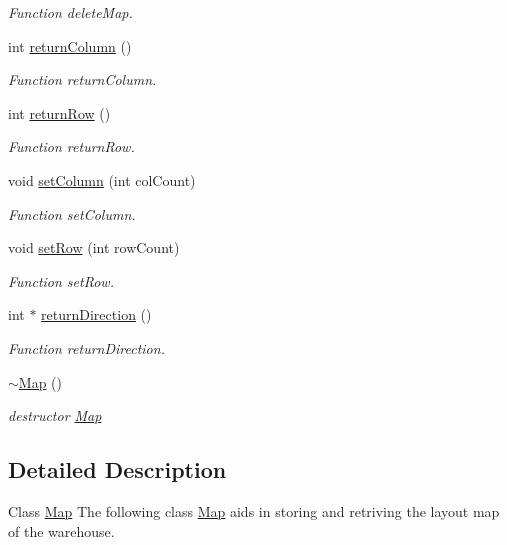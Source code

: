 \begin{DoxyCompactItemize}
\begin{DoxyCompactList}\small\item\em Function delete\+Map. \end{DoxyCompactList}\item 
int \hyperlink{classMap_ac442fa95e77caa955817ce6c1cf16211}{return\+Column} ()
\begin{DoxyCompactList}\small\item\em Function return\+Column. \end{DoxyCompactList}\item 
int \hyperlink{classMap_aa48eb6ddf2b936c52a79c116e093dbef}{return\+Row} ()
\begin{DoxyCompactList}\small\item\em Function return\+Row. \end{DoxyCompactList}\item 
void \hyperlink{classMap_a1cada959f00cfec8e9d939d51963d7f2}{set\+Column} (int col\+Count)
\begin{DoxyCompactList}\small\item\em Function set\+Column. \end{DoxyCompactList}\item 
void \hyperlink{classMap_a1ff7b603f4e295c6750bfa30374a9e13}{set\+Row} (int row\+Count)
\begin{DoxyCompactList}\small\item\em Function set\+Row. \end{DoxyCompactList}\item 
int $\ast$ \hyperlink{classMap_ae6a1a1f128a7d640c10be63e4308d86d}{return\+Direction} ()
\begin{DoxyCompactList}\small\item\em Function return\+Direction. \end{DoxyCompactList}\item 
\hyperlink{classMap_aa403fbe09394ccf39747588f5168e3b2}{$\sim$\+Map} ()
\begin{DoxyCompactList}\small\item\em destructor \hyperlink{classMap}{Map} \end{DoxyCompactList}\end{DoxyCompactItemize}


\subsection{Detailed Description}
Class \hyperlink{classMap}{Map} The following class \hyperlink{classMap}{Map} aids in storing and retriving the layout map of the warehouse. 

